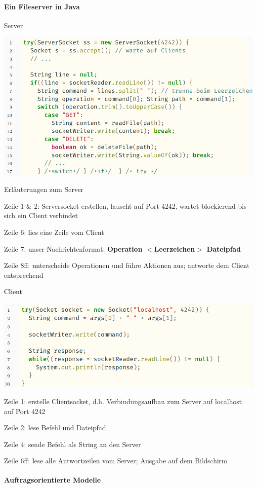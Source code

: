 \documentclass[10pt]{article}
\begin{document}
\paragraph{Ein Fileserver in Java}

Server
\begin{center}
  \includegraphics[width=0.4\linewidth]{Assets/Programmierparadigmen-code-snippet-69}
\end{center}
Erläuterungen zum Server
\begin{itemize*}
  \item Zeile 1 \& 2: Serversocket erstellen, lauscht auf Port 4242, wartet blockierend bis sich ein Client verbindet
  \item Zeile 6: lies eine Zeile vom Client
  \item Zeile 7: unser Nachrichtenformat: \textbf{Operation $<$Leerzeichen$>$ Dateipfad}
  \item Zeile 8ff: unterscheide Operationen und führe Aktionen aus; antworte dem Client entsprechend
\end{itemize*}

Client
\begin{center}
  \includegraphics[width=0.4\linewidth]{Assets/Programmierparadigmen-code-snippet-70}
\end{center}
\begin{itemize*}
  \item Zeile 1: erstelle Clientsocket, d.h. Verbindungsaufbau zum Server auf localhost auf Port 4242
  \item Zeile 2: lese Befehl und Dateipfad
  \item Zeile 4: sende Befehl als String an den Server
  \item Zeile 6ff: lese alle Antwortzeilen vom Server; Ausgabe auf dem Bildschirm
\end{itemize*}

\paragraph{Auftragsorientierte Modelle}
\end{document}
